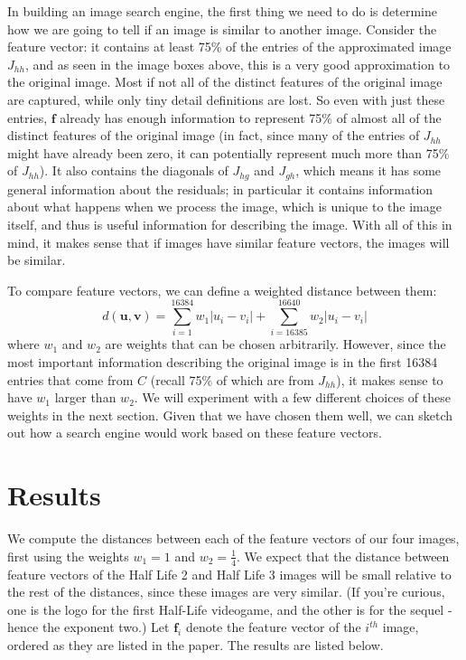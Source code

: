 \documentclass[11 pt]{article}
\begin{document}
In building an image search engine, the first thing we need to do is determine how we are going to tell if an image is similar to another image. Consider the feature vector: it contains at least 75\% of the entries of the approximated image $J_{hh}$, and as seen in the image boxes above, this is a very good approximation to the original image. Most if not all of the distinct features of the original image are captured, while only tiny detail definitions are lost. So even with just these entries, $\mathbf{f}$ already has enough information to represent 75\% of almost all of the distinct features of the original image (in fact, since many of the entries of $J_{hh}$ might have already been zero, it can potentially represent much more than 75\% of $J_{hh}$). It also contains the diagonals of $J_{hg}$ and $J_{gh}$, which means it has some general information about the residuals; in particular it contains information about what happens when we process the image, which is unique to the image itself, and thus is useful information for describing the image. With all of this in mind, it makes sense that if images have similar feature vectors, the images will be similar.

To compare feature vectors, we can define a weighted distance between them:
$$d(\mathbf{u},\mathbf{v})=\sum_{i=1}^{16384} w_1|u_i-v_i| + \sum_{i=16385}^{16640}w_2 |u_i-v_i|$$ where $w_1$ and $w_2$ are weights that can be chosen arbitrarily. However, since the most important information describing the original image is in the first 16384 entries that come from $C$ (recall 75\% of which are from $J_{hh}$), it makes sense to have $w_1$ larger than $w_2$. We will experiment with a few different choices of these weights in the next section. Given that we have chosen them well, we can sketch out how a search engine would work based on these feature vectors.

\section{Results}
\indent\indent We compute the distances between each of the feature vectors of our four images, first using the weights $w_1=1$ and $w_2=\frac{1}{4}$. We expect that the distance between feature vectors of the Half Life 2 and Half Life 3 images will be small relative to the rest of the distances, since these images are very similar. (If you're curious, one is the logo for the first Half-Life videogame, and the other is for the sequel - hence the exponent two.) Let $\mathbf{f}_i$ denote the feature vector of the $i^{th}$ image, ordered as they are listed in the paper. The results are listed below.
\end{document}
